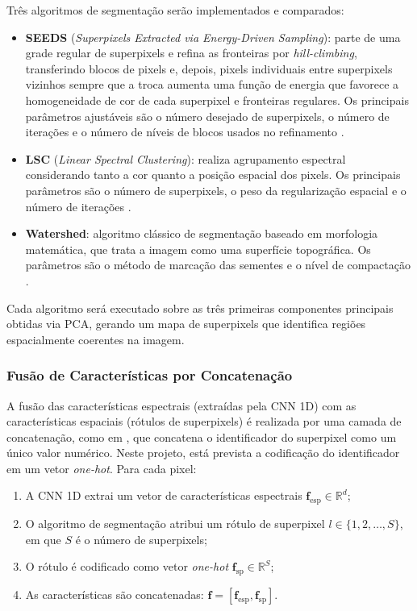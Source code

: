 Três algoritmos de segmentação serão implementados e comparados:

\begin{itemize}
    \item \textbf{SEEDS} (\textit{Superpixels Extracted via Energy-Driven Sampling}): parte de uma grade regular de superpixels e refina as fronteiras por \textit{hill-climbing}, transferindo blocos de pixels e, depois, pixels individuais entre superpixels vizinhos sempre que a troca aumenta uma função de energia que favorece a homogeneidade de cor de cada superpixel e fronteiras regulares. Os principais parâmetros ajustáveis são o número desejado de superpixels, o número de iterações e o número de níveis de blocos usados no refinamento \cite{bergh2013seedssuperpixelsextractedenergydriven}.
    \item \textbf{LSC} (\textit{Linear Spectral Clustering}): realiza agrupamento espectral considerando tanto a cor quanto a posição espacial dos pixels. Os principais parâmetros são o número de superpixels, o peso da regularização espacial e o número de iterações \cite{Zhengqin7298741}.
    \item \textbf{Watershed}: algoritmo clássico de segmentação baseado em morfologia matemática, que trata a imagem como uma superfície topográfica. Os parâmetros são o método de marcação das sementes e o nível de compactação \cite{Najman546254}.
\end{itemize}

Cada algoritmo será executado sobre as três primeiras componentes principais obtidas via PCA, gerando um mapa de superpixels que identifica regiões espacialmente coerentes na imagem.

\subsubsection{Fusão de Características por Concatenação}

A fusão das características espectrais (extraídas pela CNN 1D) com as características espaciais (rótulos de superpixels) é realizada por uma camada de concatenação, como em , que concatena o identificador do superpixel como um único valor numérico. Neste projeto, está prevista a codificação do identificador em um vetor \textit{one-hot}. Para cada pixel:

\begin{enumerate}
    \item A CNN 1D extrai um vetor de características espectrais $\mathbf{f}_{\text{esp}} \in \mathbb{R}^{d}$;
    \item O algoritmo de segmentação atribui um rótulo de superpixel $l \in \{1, 2, \ldots, S\}$, em que $S$ é o número de superpixels;
    \item O rótulo é codificado como vetor \textit{one-hot} $\mathbf{f}_{\text{sp}} \in \mathbb{R}^{S}$;
    \item As características são concatenadas: $\mathbf{f} = [\mathbf{f}_{\text{esp}}, \mathbf{f}_{\text{sp}}]$.
\end{enumerate}

